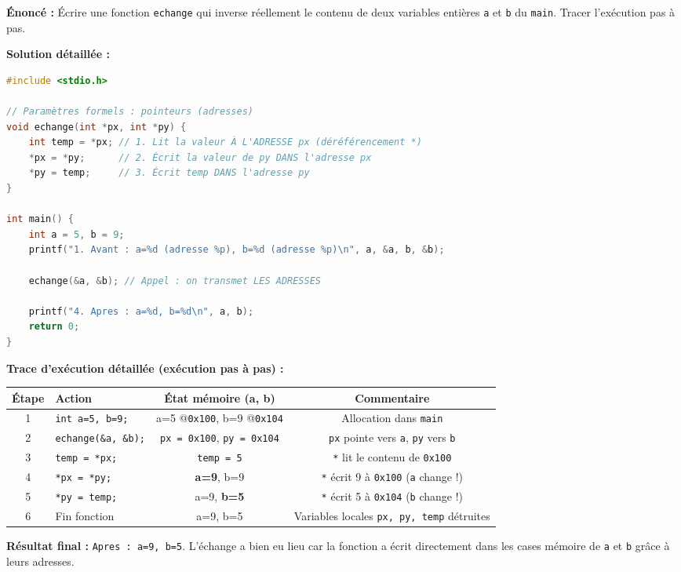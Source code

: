 \documentclass[11pt]{article}
\begin{document}
\begin{exoresolu}
\textbf{Énoncé :} Écrire une fonction \texttt{echange} qui inverse réellement le contenu de deux variables entières \texttt{a} et \texttt{b} du \texttt{main}. Tracer l'exécution pas à pas.

\textbf{Solution détaillée :}

\begin{lstlisting}[language=C]
#include <stdio.h>

// Paramètres formels : pointeurs (adresses)
void echange(int *px, int *py) {
    int temp = *px; // 1. Lit la valeur À L'ADRESSE px (déréférencement *)
    *px = *py;      // 2. Écrit la valeur de py DANS l'adresse px
    *py = temp;     // 3. Écrit temp DANS l'adresse py
}

int main() {
    int a = 5, b = 9;
    printf("1. Avant : a=%d (adresse %p), b=%d (adresse %p)\n", a, &a, b, &b);
    
    echange(&a, &b); // Appel : on transmet LES ADRESSES
    
    printf("4. Apres : a=%d, b=%d\n", a, b);
    return 0;
}
\end{lstlisting}

\textbf{Trace d'exécution détaillée (exécution pas à pas) :}

\begin{center}
\begin{tabularx}{\linewidth}{|c|X|c|c|}
\hline
\textbf{Étape} & \textbf{Action} & \textbf{État mémoire (a, b)} & \textbf{Commentaire} \\
\hline
1 & \texttt{int a=5, b=9;} & a=5 @\texttt{0x100}, b=9 @\texttt{0x104} & Allocation dans \texttt{main} \\
\hline
2 & \texttt{echange(\&a, \&b);} & \texttt{px = 0x100}, \texttt{py = 0x104} & \texttt{px} pointe vers \texttt{a}, \texttt{py} vers \texttt{b} \\
\hline
3 & \texttt{temp = *px;} & \texttt{temp = 5} & \texttt{*} lit le contenu de \texttt{0x100} \\
\hline
4 & \texttt{*px = *py;} & \textbf{a=9}, b=9 & \texttt{*} écrit 9 à \texttt{0x100} (\texttt{a} change !) \\
\hline
5 & \texttt{*py = temp;} & a=9, \textbf{b=5} & \texttt{*} écrit 5 à \texttt{0x104} (\texttt{b} change !) \\
\hline
6 & Fin fonction & a=9, b=5 & Variables locales \texttt{px, py, temp} détruites \\
\hline
\end{tabularx}
\end{center}

\textbf{Résultat final :} \texttt{Apres : a=9, b=5}. L'échange a bien eu lieu car la fonction a écrit directement dans les cases mémoire de \texttt{a} et \texttt{b} grâce à leurs adresses.
\end{exoresolu}
\end{document}
